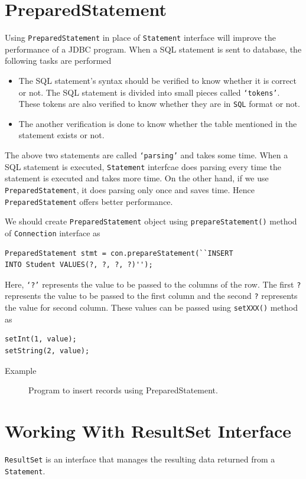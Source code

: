 \documentclass[11pt,a4paper]{article}
\begin{document}
\section*{PreparedStatement}
Using \texttt{PreparedStatement} in place of \texttt{Statement} interface will improve the performance of a JDBC program. When a SQL statement is sent to database, the following tasks are performed
\begin{itemize}
\item The SQL statement's syntax should be verified to know whether it is correct or not. The SQL statement is divided into small pieces called \texttt{`tokens'}. These tokens are also verified to know whether they are in \texttt{SQL} format or not.
\item The another verification is done to know whether the table mentioned in the statement exists or not.
 \end{itemize}
The above two statements are called \texttt{`parsing'} and takes some time. When a SQL statement is executed, \texttt{Statement} interfcae does parsing every time the statement is executed and takes more time. On the other hand, if we use \texttt{PreparedStatement}, it does parsing only once and saves time. Hence \texttt{PreparedStatement} offers better performance.

We should create \texttt{PreparedStatement} object using \texttt{prepareStatement()} method of \texttt{Connection} interface as

\begin{lstlisting}[numbers=none]
PreparedStatement stmt = con.prepareStatement(``INSERT 
INTO Student VALUES(?, ?, ?, ?)'');
\end{lstlisting}
Here, \texttt{`?'} represents the value to be passed to the columns of the row. The first \texttt{?} represents the value to be passed to the first column and the second \texttt{?} represents the value for second column. These values can be passed using \texttt{setXXX()} method as
\begin{lstlisting}[numbers=none]
setInt(1, value);
setString(2, value);
\end{lstlisting}

\begin{description}
\item[Example] Program to insert records using PreparedStatement.

\end{description}
\section*{Working With ResultSet Interface}
\texttt{ResultSet} is an interface that manages the resulting data returned from a \texttt{Statement}.
\end{document}
